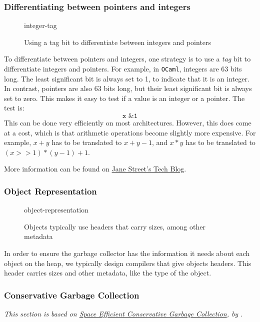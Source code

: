 \subsubsection{Differentiating between pointers and integers}
\begin{figure}[H]
    \centering
    {integer-tag}
    \caption{Using a tag bit to differentiate between integers and pointers}
    \label{fig:integer-tag}
\end{figure}
To differentiate between pointers and integers, one strategy is to use a \textit{tag} bit to differentiate integers and pointers. For example, in \texttt{OCaml}, integers are 63 bits long. The least significant bit is always set to 1, to indicate that it is an integer. In contrast, pointers are also 63 bits long, but their least significant bit is always set to zero. This makes it easy to test if a value is an integer or a pointer. The test is:
\[\texttt{x \& 1}\]
This can be done very efficiently on most architectures. However, this does come at a cost, which is that arithmetic operations become slightly more expensive. For example,  $x+y$ has to be translated to $x+y - 1$, and $x * y$ has to be translated to $(x >> 1) * (y-1) + 1$.

More information can be found on \href{https://blog.janestreet.com/what-is-gained-and-lost-with-63-bit-integers/}{Jane Street's Tech Blog}.

\subsubsection{Object Representation}
\begin{figure}[H]
    \centering
    {object-representation}
    \caption{Objects typically use headers that carry sizes, among other metadata}
    \label{fig:object-representation}
\end{figure}

In order to ensure the garbage collector has the information it needs about each object on the heap, we typically design compilers that give objects headers. This header carries sizes and other metadata, like the type of the object. 

\subsubsection{Conservative Garbage Collection\optional}
\textit{This section is based on \href{https://dl.acm.org/doi/10.1145/155090.155109}{Space Efficient Conservative Garbage Collection}, by} \citet{boehm-1993}.


